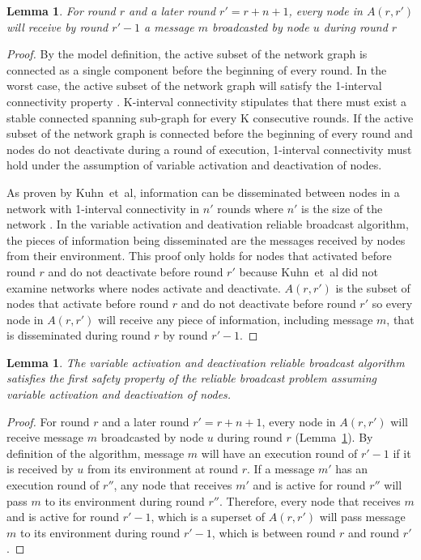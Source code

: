 \documentclass[english]{article}
\newtheorem{lemma}[theorem]{Lemma}
\begin{document}
\begin{lemma}
\label{RBDeactivationReceive}
For round $r$ and a later round $r' = r + n + 1$, every node in $A(r,r')$ will receive by round $r'-1$ a message $m$ broadcasted by node $u$ during round $r$
\end{lemma}
\begin{proof}

By the model definition, the active subset of the network graph is connected as a single component before the beginning of every round. In the worst case, the active subset of the network graph will satisfy the 1-interval connectivity property \cite{Kuhn:2010}. K-interval connectivity stipulates that there must exist a stable connected spanning sub-graph for every K consecutive rounds. If the active subset of the network graph is connected before the beginning of every round and nodes do not deactivate during a round of execution, 1-interval connectivity must hold under the assumption of variable activation and deactivation of nodes. 

As proven by Kuhn~et~al, information can be disseminated between nodes in a network with 1-interval connectivity in $n'$ rounds where $n'$ is the size of the network \cite{Kuhn:2010}. In the variable activation and deativation reliable broadcast algorithm, the pieces of information being disseminated are the messages received by nodes from their environment. This proof only holds for nodes that activated before round $r$ and do not deactivate before round $r'$ because Kuhn~et~al did not examine networks where nodes activate and deactivate. $A(r,r')$ is the subset of nodes that activate before round $r$ and do not deactivate before round $r'$ so every node in $A(r,r')$ will receive any piece of information, including message $m$, that is disseminated during round $r$ by round $r'-1$.

\end{proof}


\begin{lemma}
\label{DeactivationRBSafety1}
The variable activation and deactivation reliable broadcast algorithm satisfies the first safety property of the reliable broadcast problem assuming variable activation and deactivation of nodes.
\end{lemma}
\begin{proof}

For round $r$ and a later round $r' = r + n + 1$, every node in $A(r,r')$ will receive message $m$ broadcasted by node $u$ during round $r$ (Lemma~\ref{RBDeactivationReceive}). By definition of the algorithm, message $m$ will have an execution round of $r'-1$ if it is received by $u$ from its environment at round $r$. If a message $m'$ has an execution round of $r''$, any node that receives $m'$ and is active for round $r''$ will pass $m$ to its environment during round $r''$. Therefore, every node that receives $m$ and is active for round $r'-1$, which is a superset of $A(r,r')$ will pass message $m$ to its environment during round $r'-1$, which is between round $r$ and round $r'$.

\end{proof}
\end{document}
